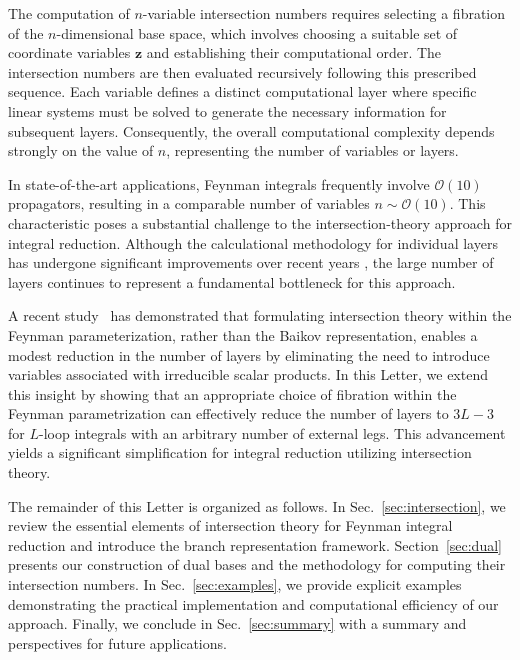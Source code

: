 \documentclass[reprint,superscriptaddress]{revtex4-2}
\begin{document}
The computation of $n$-variable intersection numbers requires selecting a fibration of the $n$-dimensional base space, which involves choosing a suitable set of coordinate variables $\bm{z}$ and establishing their computational order. The intersection numbers are then evaluated recursively following this prescribed sequence. Each variable defines a distinct computational layer where specific linear systems must be solved to generate the necessary information for subsequent layers. Consequently, the overall computational complexity depends strongly on the value of $n$, representing the number of variables or layers.

In state-of-the-art applications, Feynman integrals frequently involve $\mathcal{O}(10)$ propagators, resulting in a comparable number of variables $n \sim \mathcal{O}(10)$. This characteristic poses a substantial challenge to the intersection-theory approach for integral reduction. Although the calculational methodology for individual layers has undergone significant improvements over recent years \cite{Fontana:2023amt, Brunello:2023rpq, Brunello:2024tqf}, the large number of layers continues to represent a fundamental bottleneck for this approach.

A recent study~\cite{Lu:2024dsb} has demonstrated that formulating intersection theory within the Feynman parameterization, rather than the Baikov representation, enables a modest reduction in the number of layers by eliminating the need to introduce variables associated with irreducible scalar products. In this Letter, we extend this insight by showing that an appropriate choice of fibration within the Feynman parametrization can effectively reduce the number of layers to $3L-3$ for $L$-loop integrals with an arbitrary number of external legs. This advancement yields a significant simplification for integral reduction utilizing intersection theory.

The remainder of this Letter is organized as follows. In Sec.~\ref{sec:intersection}, we review the essential elements of intersection theory for Feynman integral reduction and introduce the branch representation framework. Section~\ref{sec:dual} presents our construction of dual bases and the methodology for computing their intersection numbers. In Sec.~\ref{sec:examples}, we provide explicit examples demonstrating the practical implementation and computational efficiency of our approach. Finally, we conclude in Sec.~\ref{sec:summary} with a summary and perspectives for future applications.
\end{document}
